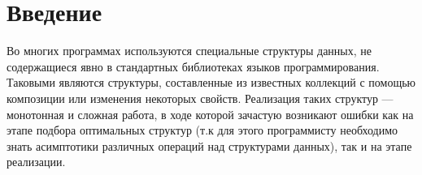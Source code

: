 \documentclass[14pt]{matmex-diploma-custom}
\begin{document}
\maketitle
\tableofcontents
\section*{Введение}
Во многих программах используются специальные структуры данных, не содержащиеся явно в стандартных библиотеках языков программирования. Таковыми являются структуры, составленные из известных коллекций с помощью композиции или изменения некоторых свойств. Реализация таких структур --- монотонная и сложная работа, в ходе которой зачастую возникают ошибки как на этапе подбора оптимальных структур (т.к для этого программисту необходимо знать асимптотики различных операций над структурами данных), так и на этапе реализации.
\end{document}
